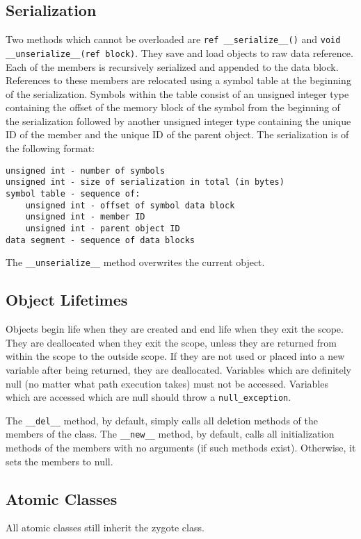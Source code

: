 \documentclass[10pt,a4paper]{article}
\begin{document}
\subsection{Serialization}
Two methods which cannot be overloaded are \verb|ref __serialize__()| and \linebreak
\verb|void __unserialize__(ref block)|. They save and load objects to raw data reference. Each of the members is recursively serialized and appended to the data block. References to these members are relocated using a symbol table at the beginning of the serialization. Symbols within the table consist of an unsigned integer type containing the offset of the memory block of the symbol from the beginning of the serialization followed by another unsigned integer type containing the unique ID of the member and the unique ID of the parent object. The serialization is of the following format:
\begin{verbatim}
unsigned int - number of symbols
unsigned int - size of serialization in total (in bytes)
symbol table - sequence of:
    unsigned int - offset of symbol data block
    unsigned int - member ID
    unsigned int - parent object ID
data segment - sequence of data blocks
\end{verbatim}

The \verb|__unserialize__| method overwrites the current object.

\subsection{Object Lifetimes}
Objects begin life when they are created and end life when they exit the scope. They are deallocated when they exit the scope, unless they are returned from within the scope to the outside scope. If they are not used or placed into a new variable after being returned, they are deallocated. Variables which are definitely null (no matter what path execution takes) must not be accessed. Variables which are accessed which are null should throw a \verb|null_exception|.

The \verb|__del__| method, by default, simply calls all deletion methods of the members of the class. The \verb|__new__| method, by default, calls all initialization methods of the members with no arguments (if such methods exist). Otherwise, it sets the members to null.

\subsection{Atomic Classes}
All atomic classes still inherit the zygote class. 
\end{document}
